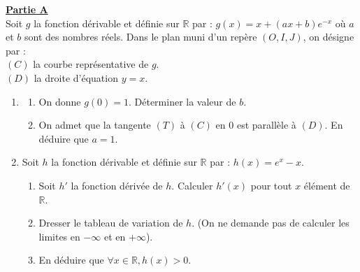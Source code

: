 \documentclass[12pt,a4paper]{article}
\begin{document}
\noindent \underline{\textbf{Partie A}} \\
Soit $g$ la fonction dérivable et définie sur $\mathbb{R}$ par : $g(x) = x + (ax + b)e^{-x}$ où $a$ et $b$ sont des nombres réels. Dans le plan muni d'un repère $(O, I, J)$, on désigne par : \\
$(C)$ la courbe représentative de $g$. \\
$(D)$ la droite d'équation $y = x$.
\begin{enumerate}
    \item \begin{enumerate}
        \item On donne $g(0) = 1$. Déterminer la valeur de $b$.
        \item On admet que la tangente $(T)$ à $(C)$ en 0 est parallèle à $(D)$. En déduire que $a = 1$.
    \end{enumerate}
    \item Soit $h$ la fonction dérivable et définie sur $\mathbb{R}$ par : $h(x) = e^x - x$.
    \begin{enumerate}
        \item Soit $h'$ la fonction dérivée de $h$. Calculer $h'(x)$ pour tout $x$ élément de $\mathbb{R}$.
        \item Dresser le tableau de variation de $h$. (On ne demande pas de calculer les limites en $-\infty$ et en $+\infty$).
        \item En déduire que $\forall x \in \mathbb{R} , h(x) > 0$.
    \end{enumerate}
\end{enumerate}

\vspace{0.5cm}
\end{document}
